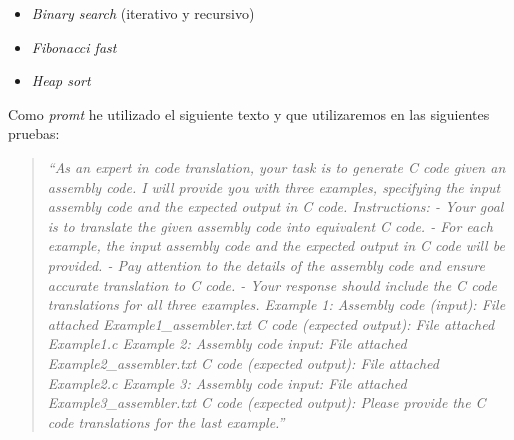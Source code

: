 \begin{itemize}
    \item \textit{Binary search} (iterativo y recursivo)
    \item \textit{Fibonacci fast}
    \item \textit{Heap sort}
\end{itemize}

Como \textit{promt} he utilizado el siguiente texto y que utilizaremos en las siguientes
pruebas:

\begin{quote}
    \textit{``As an expert in code translation, your task is to generate C code given
    an assembly code. I will provide you with three examples, specifying the input
    assembly code and the expected output in C code.\newline \newline
    Instructions:\newline
    - Your goal is to translate the given assembly code into equivalent C code.\newline
    - For each example, the input assembly code and the expected output in C code will be provided.\newline
    - Pay attention to the details of the assembly code and ensure accurate translation to C code.\newline
    - Your response should include the C code translations for all three examples.\newline \newline
    Example 1:\newline
    Assembly code (input):\newline
    File attached Example1\_assembler.txt\newline
    C code (expected output):\newline
    File attached Example1.c\newline \newline
    Example 2:\newline
    Assembly code input:\newline
    File attached Example2\_assembler.txt\newline
    C code (expected output):\newline
    File attached Example2.c\newline \newline
    Example 3:\newline
    Assembly code input:\newline
    File attached Example3\_assembler.txt\newline
    C code (expected output):\newline \newline
    Please provide the C code translations for the last example.''}
\end{quote}


